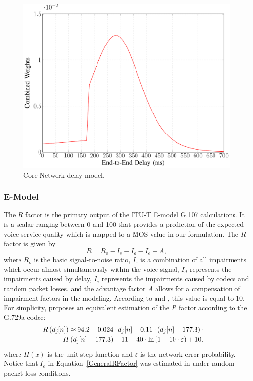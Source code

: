 \documentclass[conference]{IEEEtran}
\newcommand{\EqRef}[1]{Equation~\ref{#1}}
\begin{document}
\begin{figure}
	\centering
	\includegraphics[width=0.55\linewidth,page=5]{figs_wp2/figs_BRUNO_PEDRO/plots}
	\caption{Core Network delay model.}
	\label{Fig:EndToEndDelay}
\end{figure}	

\subsubsection{E-Model}
The $ R $ factor is the primary output of the ITU-T E-model G.107 \cite{itu2005107} calculations. It is a scalar ranging between 0 and 100 that provides a prediction of the expected voice service quality which is mapped to a \ac{MOS} value in our formulation. The $ R $ factor is given by
%
\begin{equation}
\label{GeneralRFactor}
R = R_o - I_s - I_d - I_e + A,
\end{equation} 
%
where $R_o$ is the basic signal-to-noise ratio, $I_s$ is a combination of all impairments which occur almost simultaneously within the voice signal, $I_d $ represents the impairments caused by delay, $I_e$ represents the impairments caused by codecs and random packet losses, and the advantage factor $A$ allows for a compensation of impairment factors in the modeling. According to \cite{itu2005107} and \cite{cole2001voice}, this value is equal to 10.
For simplicity, \cite{cole2001voice} proposes an equivalent estimation of the $ R $ factor according to the G.729a codec:
%
\begin{align}
R\left(d_j[n]\right) \approx 94.2 - 0.024 \cdot d_j[n] - 0.11 \cdot \left(d_j[n] - 177.3\right) \cdot  \notag \\ H\left(d_j[n] - 177.3\right) - 11 - 40 \cdot \ln\left(1 + 10\cdot \varepsilon\right) + 10. &	
\end{align}
%
where $H(x)$ is the unit step function and $\varepsilon$ is the network error probability. Notice that $I_e$ in \EqRef{GeneralRFactor} was estimated in \cite{cole2001voice} under random packet loss conditions.
%		
%		
\end{document}
